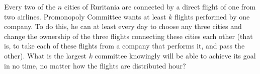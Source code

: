 \documentclass[11pt]{scrartcl}
\begin{document}
\begin{problem}[231259391294064]
Every two of the $n$ cities of Ruritania are connected by a direct flight of one from two airlines. Promonopoly Committee wants at least $k$ flights performed by one company. To do this, he can at least every day to choose any three cities and change the ownership of the three flights connecting these cities each other (that is, to take each of these flights from a company that performs it, and pass the other). What is the largest $k$ committee knowingly will be able to achieve its goal in no time, no matter how the flights are distributed hour?
\end{problem}
\end{document}

